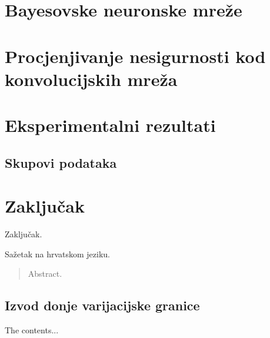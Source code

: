 \documentclass[utf8, diplomski, lmodern]{fer}
\begin{document}
\chapter{Bayesovske neuronske mreže}



\chapter{Procjenjivanje nesigurnosti kod konvolucijskih mreža}



\chapter{Eksperimentalni rezultati}


\section{Skupovi podataka}



\chapter{Zaključak}

Zaključak.




\begin{sazetak}
Sažetak na hrvatskom jeziku.

\end{sazetak}

\begin{abstract}
Abstract.

\end{abstract}

\begin{appendices}
	\chapter{Izvod donje varijacijske granice}
	The contents...
\end{appendices}
\end{document}
